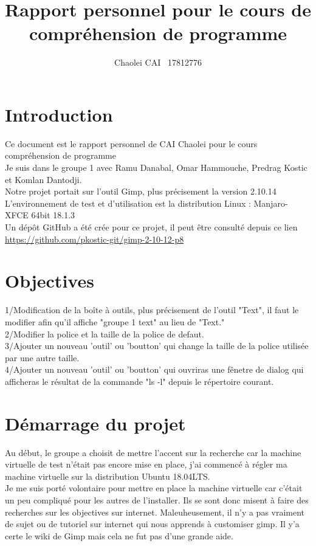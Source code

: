 \documentclass[12pt, letterpaper]{article}
\title{Rapport personnel pour le cours de compréhension de programme}
\author{Chaolei CAI \ 17812776}
\begin{document}
\begin{titlepage}
    \maketitle
\end{titlepage}

\tableofcontents
\section{Introduction}
Ce document est le rapport personnel de CAI Chaolei pour le cours compréhension de programme\\
Je suis dans le groupe 1 avec Ramu Danabal, Omar Hammouche, Predrag Kostic et Komlan Dantodji. \\
Notre projet portait sur l'outil Gimp, plus précisement la version 2.10.14\\
L'environnement de test et d'utilisation est la distribution Linux : Manjaro-XFCE 64bit 18.1.3\\
Un dépôt GitHub a été crée pour ce projet, il peut être consulté depuis ce lien \url{https://github.com/pkostic-git/gimp-2-10-12-p8}


\section{Objectives}
1/Modification de la boîte à outils, plus précisement de l'outil "Text", il faut le modifier afin qu'il affiche "groupe 1 text" au lieu de "Text."\\
2/Modifier la police et la taille de la police de defaut.\\
3/Ajouter un nouveau 'outil' ou 'boutton' qui change la taille de la police utilisée par une autre taille.\\
4/Ajouter un nouveau 'outil' ou 'boutton' qui ouvriras une fênetre de dialog qui afficheras le résultat de la commande "ls -l" depuis le répertoire courant.

\section{Démarrage du projet}
Au début, le groupe a choisit de mettre l'accent sur la recherche car la machine virtuelle de test n'était pas encore mise en place, j'ai commencé à régler ma machine virtuelle sur la distribution Ubuntu 18.04LTS.\\
Je me suis porté volontaire pour mettre en place la machine virtuelle car c'était un peu compliqué pour les autres de l'installer. Ils se sont donc misent à faire des recherches sur les objectives sur internet.
 Maleuheusement, il n'y a pas vraiment de sujet ou de tutoriel sur internet qui nous apprends à customiser gimp. Il y'a certe le wiki de Gimp mais cela ne fut pas d'une grande aide.\\
\end{document}
